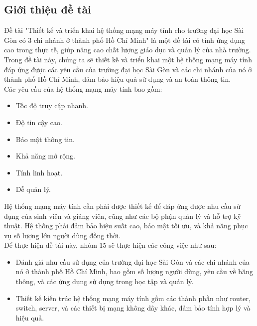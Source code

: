 \documentclass[12pt, a4paper]{article}
\begin{document}
	\subsection{Giới thiệu đề tài}
	\begin{flushleft}
		\hspace{1.5cm}Đề tài "Thiết kế và triển khai hệ thống mạng máy tính cho trường đại học Sài Gòn có 3 chi nhánh ở thành phố Hồ Chí Minh" là một đề tài có tính ứng dụng cao trong thực tế, giúp nâng cao chất lượng giáo dục và quản lý của nhà trường. \\
		\hspace{1.5cm}Trong đề tài này, chúng ta sẽ thiết kế và triển khai một hệ thống mạng máy tính đáp ứng được các yêu cầu của trường đại học Sài Gòn và các chi nhánh của nó ở thành phố Hồ Chí Minh, đảm bảo hiệu quả sử dụng và an toàn thông tin.
		\\\hspace{1.5cm}Các yêu cầu của hệ thống mạng máy tính bao gồm: 
		\begin{itemize}[leftmargin=2.3cm, itemsep=0pt, topsep=0pt]
			\item Tốc độ truy cập nhanh.
			\item Độ tin cậy cao.
			\item Bảo mật thông tin.
			\item Khả năng mở rộng.
			\item Tính linh hoạt.
			\item Dễ quản lý. 
		\end{itemize}
		\hspace{1.5cm}Hệ thống mạng máy tính cần phải được thiết kế để đáp ứng được nhu cầu sử dụng của sinh viên và giảng viên, cũng như các bộ phận quản lý và hỗ trợ kỹ thuật. Hệ thống phải đảm bảo hiệu suất cao, bảo mật tối ưu, và khả năng phục vụ số lượng lớn người dùng đồng thời.
		\\\hspace{1.5cm}Để thực hiện đề tài này, nhóm 15 sẽ thực hiện các công việc như sau:
		\begin{itemize}[leftmargin=2.3cm, itemsep=0pt, topsep=0pt]
			\item  Đánh giá nhu cầu sử dụng của trường đại học Sài Gòn và các chi nhánh của nó ở thành phố Hồ Chí Minh, bao gồm số lượng người dùng, yêu cầu về băng thông, và các ứng dụng sử dụng trong học tập và quản lý.
			\item  Thiết kế kiến trúc hệ thống mạng máy tính gồm các thành phần như router, switch, server, và các thiết bị mạng không dây khác, đảm bảo tính hợp lý và hiệu quả.

\end{itemize}
\end{flushleft}
\end{document}
